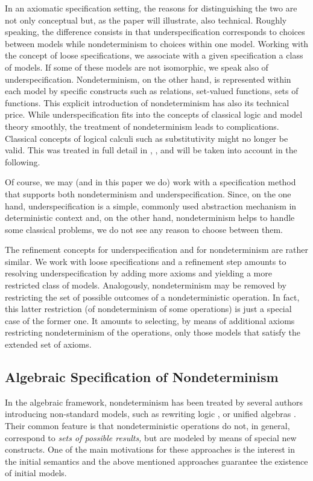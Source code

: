 In an axiomatic specification setting, the reasons for distinguishing the two are not only conceptual but, as the paper will illustrate, also technical. Roughly speaking, the difference consists in that underspecification corresponds to choices between models while nondeterminism to choices within one model. Working with the concept of loose specifications, we associate with a given specification a class of models. If some of these models are not isomorphic, we speak also of underspecification. Nondeterminism, on the other hand, is represented within each model by specific constructs such as relations, set-valued functions, sets of functions.
This explicit introduction of nondeterminism has also its technical price. While underspecification fits into the concepts of classical logic and model theory smoothly, the treatment of nondeterminism leads to complications. Classical concepts of logical calculi such as substitutivity might no longer be valid.
This was treated in full detail in \cite{top}, \cite{adt}, and will be taken into account in the following.

Of course, we may (and in this paper we do) work with a specification method that supports both
nondeterminism and underspecification. Since, on the one hand, underspecification is a simple, commonly used abstraction mechanism in deterministic
context and, on the other hand, nondeterminism helps to handle some classical problems, we do not see any reason to choose between them. 

The refinement concepts for underspecification and for nondeterminism are rather similar.
We work with loose specifications and a refinement step amounts to resolving underspecification
by adding more axioms and yielding a more restricted class of models. Analogously, nondeterminism may be removed by restricting the set of possible outcomes of a nondeterministic operation. In fact, this latter restriction (of nondeterminism of some operations) is just a special case of the former one. It amounts to selecting, by means of additional axioms restricting nondeterminism of the operations, 
only those models that satisfy the extended set of axioms. 

\subsection{Algebraic Specification of Nondeterminism} 
In the algebraic framework, nondeterminism has been treated by several authors
introducing non-standard models, such as rewriting logic \cite{Mes}, 
or unified algebras \cite{Mos}. Their common feature is that nondeterministic 
operations do not, in general, correspond to {\em sets of possible results,}
but are modeled by means of special new constructs. One of the main motivations for these approaches is the interest in the initial semantics and the above mentioned approaches guarantee the existence of initial models. 

